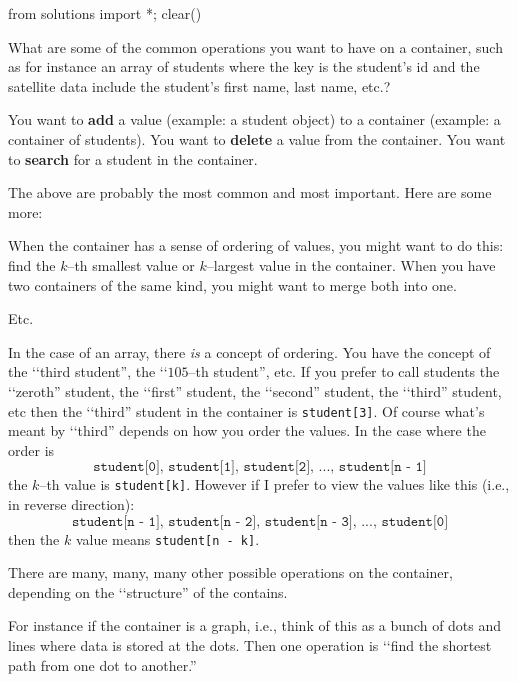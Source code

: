 \begin{python0}
from solutions import *; clear()
\end{python0}

What are some of the common operations you want to have on a container,
such as for instance an array of students where the key
is the student's id and the satellite data include
the student's first name, last name, etc.?
\begin{tightlist}
  \li You want to \textbf{add} a value
  (example: a student object) to a container
  (example: a container of students).
  \li You want to \textbf{delete} a value from the container.
  \li You want to \textbf{search} for a student in the container.
\end{tightlist}
The above are probably the most common and most important.
Here are some more:
\begin{tightlist}
  \li
  When the container has a sense of ordering of values,
  you might want to do this:
  find the $k$--th smallest value 
  or $k$--largest value in the container.
  \li
  When you have two containers of the same kind,
  you might want to merge both into one.
\end{tightlist}
Etc.

In the case of an array, there \textit{is}  a concept of ordering.
You have the concept of the \lq\lq third student'',
the \lq\lq $105$--th student'', etc.
If you prefer to call students
the  \lq\lq zeroth'' student,
the  \lq\lq first'' student,
the  \lq\lq second'' student,
the  \lq\lq third'' student, etc
then
the \lq\lq third'' student in the container is
\verb!student[3]!.
Of course what's meant by \lq\lq third'' depends on
how you order the values.
In the case where the order is
\[
\texttt{student[0], student[1], student[2], ..., student[n - 1]}
\]
the $k$--th value is \verb!student[k]!.
However if I prefer to
view the values like this (i.e., in reverse direction):
\[
\texttt{student[n - 1], student[n - 2], student[n - 3], ..., student[0]}
\]
then the $k$ value means \texttt{student[n - k]}.

There are many, many, many other possible operations
on the container, depending on the \lq\lq structure'' of the contains.

For instance if the container is a graph, i.e., think of this
as a bunch of dots and lines where data is stored at the dots.
Then one operation is \lq\lq find the shortest path from one dot
to another.''
